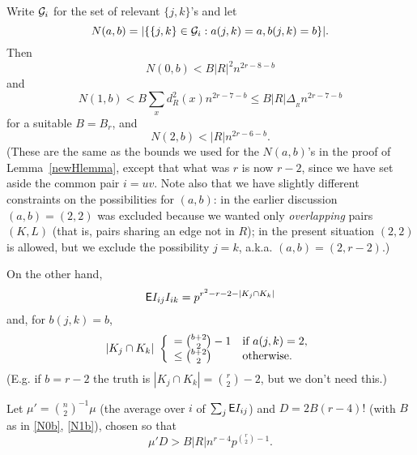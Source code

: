\documentclass[letterpaper,11pt]{article}
\newcommand{\beq}[1]{\begin{equation}\label{#1}}
\newcommand{\enq}[0]{\end{equation}}
\newcommand{\g}[0]{{\cal G}}
\newcommand{\0}[0]{\emptyset}
\newcommand{\C}[2]{{{#1}\choose{{#2}}}}
\newcommand{\Cc}[0]{\tbinom}
\newcommand{\gD}[0]{\Delta }
\begin{document}
Write $\g_i$ for the set of relevant $\{j,k\}$'s
and let
\[N(a,b)= |\{\{j,k\}\in \g_i:
a(j,k) =a, b(j,k) =b\}|.\]
%
Then
\beq{N0b}
N(0,b) < B|R|^2n^{2r-8-b}
\enq
and
\beq{N1b}
\mbox{$N(1,b) < B\sum_xd^2_R(x)n^{2r-7-b}
\leq B|R|\gD_{_R} n^{2r-7-b}$}
\enq
for a suitable $B=B_r$, and
\[N(2,b) < |R|n^{2r-6-b}.\]
%
(These are the same as the bounds we used for
the $N(a,b)$'s in the proof of Lemma~\ref{newHlemma},
except that what was $r$ is now $r-2$, since we
have set aside the common pair $i=uv$.
Note also that we have slightly different constraints
on the possibilities for $(a,b)$:
in the earlier discussion $(a,b)=(2,2)$ was excluded
because we wanted only {\em overlapping}
pairs $(K,L)$ (that is, pairs sharing an edge not in $R$);
in the present situation $(2,2)$ is
allowed,
but we exclude the possibility $j=k$, a.k.a.
$(a,b)=(2,r-2)$.)






\medskip
On the other hand,
\[
{\sf E} I_{ij}I_{ik} = p^{r^2-r-2-|K_j\cap K_k|}
\]
and, for $b(j,k)=b$,
\[
|K_j\cap K_k| ~\left\{\begin{array}{ll}
=\Cc{b+2}{2}-1&\mbox{if $a(j,k)=2$,}\\
\leq \Cc{b+2}{2}&\mbox{otherwise.}
\end{array}\right.
\]
(E.g. if $b=r-2$ the truth is $|K_j\cap K_k|= \C{r}{2}-2$,
but we don't need this.)

\medskip
Let $\mu'=\C{n}{2}^{-1}\mu$
(the average over $i$ of $\sum_j {\sf E} I_{ij}$)
and $D=2B(r-4)!$
(with $B$ as in \eqref{N0b}, \eqref{N1b}), chosen so that
\[\mu' D> B |R| n^{r-4} p^{\C{r}{2}-1}.\]
\end{document}
